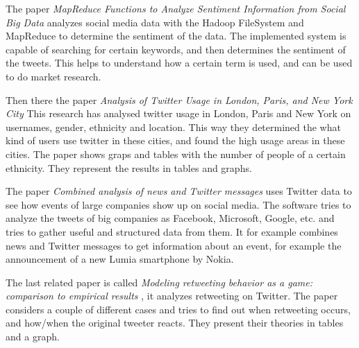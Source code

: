 The paper \emph{MapReduce Functions to Analyze Sentiment Information from Social Big Data} \cite{haMapReduceFunctionsToAnalyzeSentiment} analyzes social media data with the Hadoop FileSystem and MapReduce to determine the sentiment of the data. The implemented system is capable of searching for certain keywords, and then determines the sentiment of the tweets. This helps to understand how a certain term is used, and can be used to do market research. 

Then there the paper \emph{Analysis of Twitter Usage in London, Paris, and New York City} \cite{adnanAnalysisOfTwitterUsageInLondon} This research has analysed twitter usage in London, Paris and New York on usernames, gender, ethnicity and location. This way they determined the what kind of users use twitter in these cities, and found the high usage areas in these cities. The paper shows graps and tables with the number of people of a certain ethnicity. They represent the results in tables and graphs.

The paper \emph{Combined analysis of news and Twitter messages} \cite{duCombinedAnalysisOfNewsAndTwitterMessages} uses Twitter data to see how events of large companies show up on social media. The software tries to analyze the tweets of big companies as Facebook, Microsoft, Google, etc. and tries to gather useful and structured data from them. It for example combines news and Twitter messages to get information about an event, for example the announcement of a new Lumia smartphone by Nokia.

The last related paper is called \emph{Modeling retweeting behavior as a game: comparison to empirical results} \cite{learyModelingRetweetingBehaviorAsAGame}, it analyzes retweeting on Twitter. The paper considers a couple of different cases and tries to find out when retweeting occurs, and how/when the original tweeter reacts. They present their theories in tables and a graph.